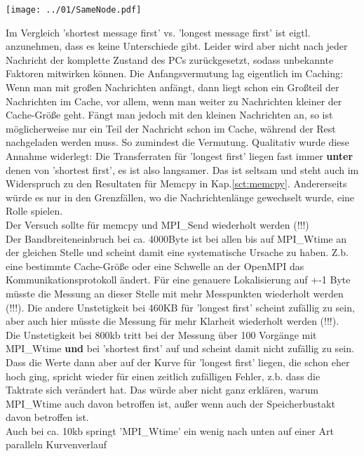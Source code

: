 \documentclass[12pt,a4paper]{article}
\begin{document}
\begin{center}
	\centering
	\captionsetup{type=figure}
	\begin{minipage}{0.6\linewidth}
		\texttt{[image: ../01/SameNode.pdf]}
	\end{minipage}
	\label{fig:SameNode}
\end{center}

Im Vergleich 'shortest message first' vs. 'longest message first' ist eigtl. anzunehmen, dass es keine Unterschiede gibt. Leider wird aber nicht nach jeder Nachricht der komplette Zustand des PCs zurückgesetzt, sodass unbekannte Faktoren mitwirken können. Die Anfangsvermutung lag eigentlich im Caching: Wenn man mit großen Nachrichten anfängt, dann liegt schon ein Großteil der Nachrichten im Cache, vor allem, wenn man weiter zu Nachrichten kleiner der Cache-Größe geht. Fängt man jedoch mit den kleinen Nachrichten an, so ist möglicherweise nur ein Teil der Nachricht schon im Cache, während der Rest nachgeladen werden muss. So zumindest die Vermutung. Qualitativ wurde diese Annahme widerlegt: Die Transferraten für 'longest first' liegen fast immer \textbf{unter} denen von 'shortest first', es ist also langsamer. Das ist seltsam und steht auch im Widerspruch zu den Resultaten für Memcpy in Kap.\ref{sct:memcpy}. Andererseits würde es nur in den Grenzfällen, wo die Nachrichtenlänge gewechselt wurde, eine Rolle spielen.\\
Der Versuch sollte für memcpy und MPI\_Send wiederholt werden (!!!)\\

Der Bandbreiteneinbruch bei ca. 4000Byte ist bei allen bis auf MPI\_Wtime an der gleichen Stelle und scheint damit eine systematische Ursache zu haben. Z.b. eine bestimmte Cache-Größe oder eine Schwelle an der OpenMPI das Kommunikationsprotokoll ändert. Für eine genauere Lokalisierung auf +-1 Byte müsste die Messung an dieser Stelle mit mehr Messpunkten wiederholt werden (!!!).
Die andere Unstetigkeit bei 460KB für 'longest first' scheint zufällig zu sein, aber auch hier müsste die Messung für mehr Klarheit wiederholt werden (!!!).\\
Die Unstetigkeit bei 800kb tritt bei der Messung über 100 Vorgänge mit MPI\_Wtime \textbf{und} bei 'shortest first' auf und scheint damit nicht zufällig zu sein. Dass die Werte dann aber auf der Kurve für 'longest first' liegen, die schon eher hoch ging, spricht wieder für einen zeitlich zufälligen Fehler, z.b. dass die Taktrate sich verändert hat. Das würde aber nicht ganz erklären, warum MPI\_Wtime auch davon betroffen ist, außer wenn auch der Speicherbustakt davon betroffen ist.\\
Auch bei ca. 10kb springt 'MPI\_Wtime' ein wenig nach unten auf einer Art paralleln Kurvenverlauf\\
\end{document}
